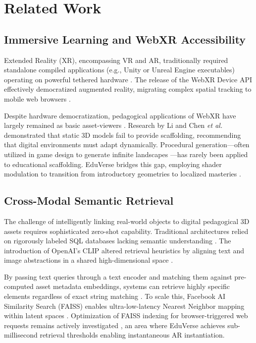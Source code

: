 \documentclass[conference]{IEEEtran}
\begin{document}
\section{Related Work}

\subsection{Immersive Learning and WebXR Accessibility}

Extended Reality (XR), encompassing VR and AR, traditionally required standalone compiled applications (e.g., Unity or Unreal Engine executables) operating on powerful tethered hardware \cite{robinson2025webxr}. The release of the WebXR Device API effectively democratized augmented reality, migrating complex spatial tracking to mobile web browsers \cite{peters2023webxr}. 

Despite hardware democratization, pedagogical applications of WebXR have largely remained as basic asset-viewers \cite{hill2025future}. Research by Li and Chen \textit{et al.} \cite{li2021scaffolding} demonstrated that static 3D models fail to provide scaffolding, recommending that digital environments must adapt dynamically. Procedural generation—often utilized in game design to generate infinite landscapes \cite{lee2025adaptive}—has rarely been applied to educational scaffolding. EduVerse bridges this gap, employing shader modulation to transition from introductory geometries to localized masteries \cite{zhang2022dynamic}. 

\subsection{Cross-Modal Semantic Retrieval}

The challenge of intelligently linking real-world objects to digital pedagogical 3D assets requires sophisticated zero-shot capability. Traditional architectures relied on rigorously labeled SQL databases lacking semantic understanding \cite{wu2025latent}. The introduction of OpenAI’s CLIP altered retrieval heuristics by aligning text and image abstractions in a shared high-dimensional space \cite{radford2021learning}.

By passing text queries through a text encoder and matching them against pre-computed asset metadata embeddings, systems can retrieve highly specific elements regardless of exact string matching \cite{anderson2023crossmodal}. To scale this, Facebook AI Similarity Search (FAISS) enables ultra-low-latency Nearest Neighbor mapping within latent spaces \cite{johnson2021faiss}. Optimization of FAISS indexing for browser-triggered web requests remains actively investigated \cite{allen2022faiss}, an area where EduVerse achieves sub-millisecond retrieval thresholds enabling instantaneous AR instantiation.
\end{document}
